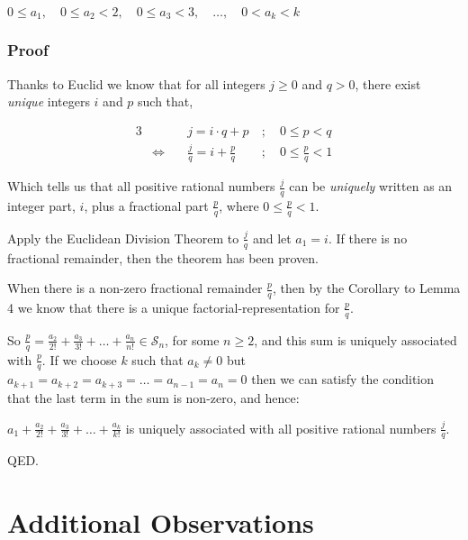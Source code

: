 \documentclass{article}
\begin{document}
{\small
\begin{center}
\(0\le{}a_1,\quad 0\le{}a_2<2,\quad 0\le{}a_3<3,\quad \dots{},\quad 0<a_k<k\)
\end{center}
}

\subsubsection*{Proof}

Thanks to Euclid we know that for all integers \(j\ge{}0\) and \(q>0\),
there exist \emph{unique} integers \(i\) and \(p\) such that,

{\normalsize
\bgroup                                  %
\setlength{\abovedisplayskip}{0pt}       %
\begin{alignat*}{3}
&&j = i\cdot{}q + p\ &;\quad 0\le{}p<q \\
&\Leftrightarrow\quad &\frac{j}{q} = i + \frac{p}{q}\ &;\quad 0\le{}\frac{p}{q}<1
\end{alignat*}
\egroup
}\par
Which tells us that all positive rational numbers \(\frac{j}{q}\) can be
\emph{uniquely}
written as
an integer part, \(i\), plus a fractional part \(\frac{p}{q}\), where \(0\le{}\frac{p}{q}<1\).

Apply the Euclidean Division Theorem to \(\frac{j}{q}\) and let \(a_1 = i\). If there is no fractional remainder, then
the theorem has been proven.

When there is a non-zero fractional remainder \(\frac{p}{q}\), then 
by the Corollary to Lemma 4 we know that there is a
unique factorial-representation for \(\frac{p}{q}\).

So \(\frac{p}{q} = \frac{a_2}{2!} + \frac{a_3}{3!} + \dots{} + \frac{a_n}{n!} \in \mathcal{S}_n\), for some
\(n \ge{} 2\), and this sum is uniquely associated with \(\frac{p}{q}\).
If we choose \(k\) such that \(a_k \ne{} 0 \) but \(a_{k+1} =
a_{k+2} =
a_{k+3} =
\dots{} =
a_{n-1} =
a_{n} = 0\) then we can satisfy the condition that the last term in the sum is non-zero, and hence:

\(a_1 + \frac{a_2}{2!} + \frac{a_3}{3!} + \dots{} + \frac{a_k}{k!}\)
is uniquely associated with all positive rational numbers \(\frac{j}{q}\).

QED.

\break
\section*{Additional Observations}
\end{document}
